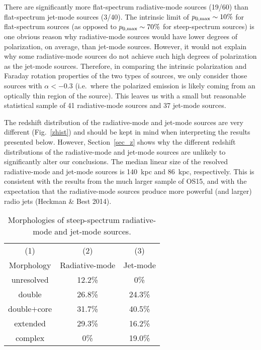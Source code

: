 \documentclass{mnras}
\begin{document}
There are significantly more flat-spectrum radiative-mode sources (19/60) than flat-spectrum jet-mode sources (3/40).
The intrinsic limit of $p_{0{\rm ,max}}\sim10\%$ for flat-spectrum sources (as opposed to $p_{0{\rm ,max}}\sim70\%$ for steep-spectrum sources) is one obvious reason why radiative-mode sources would have lower degrees of polarization, on average, than jet-mode sources. However, it would not explain why some radiative-mode sources do not achieve such high degrees of polarization as the jet-mode sources. 
Therefore, in comparing the intrinsic polarization and Faraday rotation properties of the two types of sources, we only consider those sources with $\alpha<-0.3$ (i.e.~where the polarized emission is likely coming from an optically thin region of the source). This leaves us with a small but reasonable statistical sample of 41 radiative-mode sources and 37 jet-mode sources. 

The redshift distribution of the radiative-mode and jet-mode sources are very different (Fig.~\ref{zhist}) and should be kept in mind when interpreting the results presented below. However, Section~\ref{sec_z} shows why the different redshift distributions of the radiative-mode and jet-mode sources are unlikely to significantly alter our conclusions. 
The median linear size of the resolved radiative-mode and jet-mode sources is 140~kpc and 86~kpc, respectively. This is consistent with the results from the much larger sample of OS15, and with the expectation that the radiative-mode sources produce more powerful (and larger) radio jets (Heckman \& Best 2014). 

\begin{table}%
 \caption{Morphologies of steep-spectrum radiative-mode and jet-mode sources.}
 \centering
   \begin{tabular}{ccc}
    \hline\hline
       (1) & (2) & (3)   \\
      Morphology   & Radiative-mode       & Jet-mode         \\
      \hline            
unresolved          & 12.2\%        & 0\%    \\ 
double                 & 26.8\%        & 24.3\%  \\
double$+$core    & 31.7\%       & 40.5\%  \\
extended             & 29.3\%       & 16.2\%  \\
complex               & 0\%            & 19.0\%  \\
\hline
   \end{tabular}\\
\label{radjetmorph}
\end{table}
\end{document}

